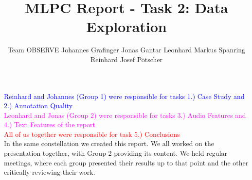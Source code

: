 \documentclass{article}
\title{MLPC Report  - Task 2: Data Exploration}
\author{
  Team OBSERVE \AND
  Johannes Grafinger 
  \And
  Jonas Gantar 
  \And 
  Leonhard Markus Spanring 
  \And 
  Reinhard Josef Pötscher
}
\begin{document}
\maketitle
\begin{contributions}
  \textcolor{blue}{Reinhard and Johannes (Group 1) were responsible for tasks 1.) Case Study and 2.) Annotation Quality} \\ 
  \textcolor{magenta}{Leonhard and Jonas (Group 2) were responsible for tasks 3.) Audio Features and 4.) Text Features of the report} \\ 
  \textcolor{red}{All of us together were responsible for task 5.) Conclusions} \\ 
  In the same constellation we created this report. We all worked on the presentation together, with Group 2 providing its content. We held regular meetings, where each group presented their results up to that point and the other critically reviewing their work.
\end{contributions}















\end{document}
